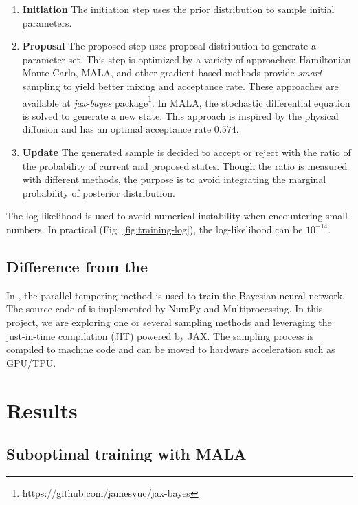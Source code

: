 \documentclass{article}
\begin{document}
\begin{enumerate}
    \item \textbf{Initiation} The initiation step uses the prior distribution to sample initial parameters.
    \item \textbf{Proposal} The proposed step uses proposal distribution to generate a  parameter set. This step is optimized by a variety of approaches\cite{jospin2022a}: Hamiltonian Monte Carlo\cite{neal1996, neal2011}, MALA, and other gradient-based methods provide \textit{smart} sampling to yield better mixing and acceptance rate. These approaches are available at \textit{jax-bayes} package\footnote{https://github.com/jamesvuc/jax-bayes}. In MALA, the stochastic differential equation is solved to generate a new state. This approach is inspired by the physical diffusion and has an optimal acceptance rate $0.574$\cite{roberts1998optimal}.
    \item \textbf{Update} The generated sample is decided to accept or reject with the ratio of the probability of current and proposed states. Though the ratio is measured with different methods, the purpose is to avoid integrating the marginal probability of posterior distribution.
\end{enumerate}


The log-likelihood is used to avoid numerical instability when encountering small numbers. In practical (Fig. \ref{fig:training-log}), the log-likelihood can be $10^{-14}$. 

\subsection{Difference from the \cite{chandra2021bayesian}}

In \cite{chandra2021bayesian}, the parallel tempering method is used to train the Bayesian neural network. The source code of \cite{chandra2019langevin} is implemented by NumPy and Multiprocessing. In this project, we are exploring one or several sampling methods and leveraging the just-in-time compilation (JIT) powered by JAX\cite{jax2018github}. The sampling process is compiled to machine code and can be moved to hardware acceleration such as GPU/TPU.


\section{Results}

\subsection{Suboptimal training with MALA}
\end{document}
